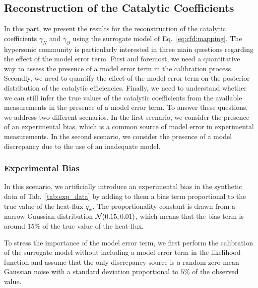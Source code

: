 \subsection{Reconstruction of the Catalytic Coefficients}
\label{sec:cfd:results:p1}

In this part, we present the results for the reconstruction of the catalytic coefficients $\gamma_N$ and $\gamma_O$ using the surrogate model of Eq.~\eqref{eq:cfd:mapping}. The hypersonic community is particularly interested in three main questions regarding the effect of the model error term. First and foremost, we need a quantitative way to assess the presence of a model error term in the calibration process. Secondly, we need to quantify the effect of the model error term on the posterior distribution of the catalytic efficiencies. Finally, we need to understand whether we can still infer the true values of the catalytic coefficients from the available measurements in the presence of a model error term. To answer these questions, we address two different scenarios. In the first scenario, we consider the presence of an experimental bias, which is a common source of model error in experimental measurements. In the second scenario, we consider the presence of a model discrepancy due to the use of an inadequate model.

\subsubsection{Experimental Bias}
\label{sc:cfd:results:p1:bias}

In this scenario, we artificially introduce an experimental bias in the synthetic data of Tab.~\ref{tab:exp_data} by adding to them a bias term proportional to the true value of the heat-flux $q_{\mathrm{w}}$. The proportionality constant is drawn from a narrow Gaussian distribution $\mathcal{N}(0.15, 0.01)$, which means that the bias term is around $15\%$ of the true value of the heat-flux.

\smallskip
To stress the importance of the model error term, we first perform the calibration of the surrogate model without including a model error term in the likelihood function and assume that the only discrepancy source is a random zero-mean Gaussian noise with a standard deviation proportional to $5\%$ of the observed value. 

